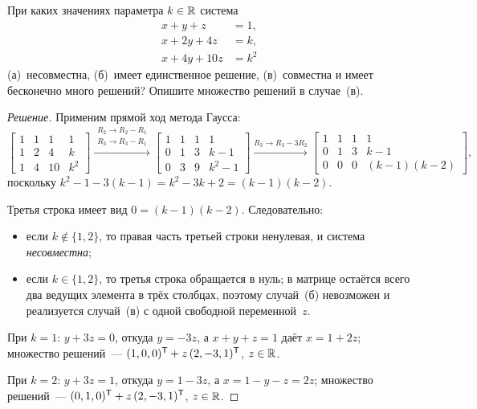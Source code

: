 \begin{problem}
\label{prob:gauss-parameter}
При каких значениях параметра $k \in \mathbb{R}$ система
\[
  \begin{aligned}
    x + y + z &= 1, \\
    x + 2y + 4z &= k, \\
    x + 4y + 10z &= k^2
  \end{aligned}
\]
(а)~несовместна, (б)~имеет единственное решение, (в)~совместна и
имеет бесконечно много решений? Опишите множество решений в
случае~(в).
\end{problem}

\begin{proof}[Решение]
Применим прямой ход метода Гаусса:
\[
  \left[\begin{array}{rrr|c}
    1 & 1 &  1 & 1 \\
    1 & 2 &  4 & k \\
    1 & 4 & 10 & k^2
  \end{array}\right]
  \xrightarrow{\substack{R_2 \to R_2 - R_1 \\ R_3 \to R_3 - R_1}}
  \left[\begin{array}{rrr|c}
    1 & 1 & 1 & 1     \\
    0 & 1 & 3 & k - 1 \\
    0 & 3 & 9 & k^2 - 1
  \end{array}\right]
  \xrightarrow{R_3 \to R_3 - 3R_2}
  \left[\begin{array}{rrr|c}
    1 & 1 & 1 & 1     \\
    0 & 1 & 3 & k - 1 \\
    0 & 0 & 0 & (k - 1)(k - 2)
  \end{array}\right],
\]
поскольку $k^2 - 1 - 3(k - 1) = k^2 - 3k + 2 = (k - 1)(k - 2)$.

Третья строка имеет вид $0 = (k - 1)(k - 2)$. Следовательно:
\begin{itemize}
  \item если $k \notin \{1, 2\}$, то правая часть третьей строки
        ненулевая, и система \emph{несовместна};
  \item если $k \in \{1, 2\}$, то третья строка обращается в нуль;
        в матрице остаётся всего два ведущих элемента в трёх столбцах,
        поэтому случай~(б) невозможен и реализуется случай~(в) с одной
        свободной переменной~$z$.
\end{itemize}
При $k = 1$: $y + 3z = 0$, откуда $y = -3z$, а $x + y + z = 1$ даёт
$x = 1 + 2z$; множество решений~--- $(1, 0, 0)^{\mathsf{T}} + z\,(2, -3, 1)^{\mathsf{T}}$,
$z \in \mathbb{R}$.

При $k = 2$: $y + 3z = 1$, откуда $y = 1 - 3z$, а $x = 1 - y - z = 2z$;
множество решений~--- $(0, 1, 0)^{\mathsf{T}} + z\,(2, -3, 1)^{\mathsf{T}}$, $z \in \mathbb{R}$.
\end{proof}
